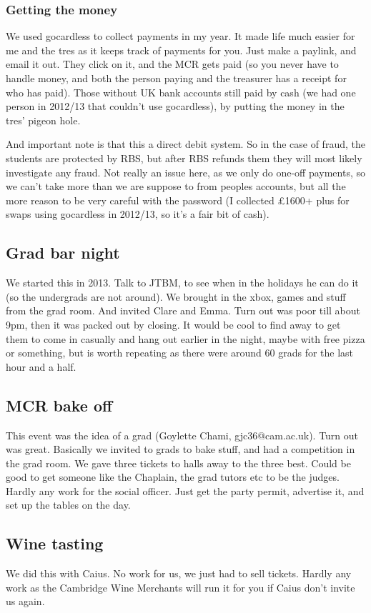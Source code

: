 \documentclass[9.5pt]{article} %
\begin{document}
\subsubsection{Getting the money}
We used gocardless to collect payments in my year. It made life much easier for me and the tres as it keeps track of payments for you. Just make a paylink, and email it out. They click on it, and the MCR gets paid (so you never have to handle money, and both the person paying and the treasurer has a receipt for who has paid). Those without UK bank accounts still paid by cash (we had one person in 2012/13 that couldn't use gocardless), by putting the money in the tres' pigeon hole.

And important note is that this a direct debit system. So in the case of fraud, the students are protected by RBS, but after RBS refunds them they will most likely investigate any fraud. Not really an issue here, as we only do one-off payments, so we can't take more than we are suppose to from peoples accounts, but all the more reason to be very careful with the password (I collected \pounds{1600}+ plus for swaps using gocardless in 2012/13, so it's a fair bit of cash).
\subsection{Grad bar night}
We started this in 2013. Talk to JTBM, to see when in the holidays he can do it (so the undergrads are not around). We brought in the xbox, games and stuff from the grad room. And invited Clare and Emma. Turn out was poor till about 9pm, then it was packed out by closing. It would be cool to find away to get them to come in casually and hang out earlier in the night, maybe with free pizza or something, but is worth repeating as there were around 60 grads for the last hour and a half.


\subsection{MCR bake off}
This event was the idea of a grad (Goylette Chami, gjc36@cam.ac.uk). Turn out was great. Basically we invited to grads to bake stuff, and had a competition in the grad room. We gave three tickets to halls away to the three best. Could be good to get someone like the Chaplain, the grad tutors etc to be the judges. Hardly any work for the social officer. Just get the party permit, advertise it, and set up the tables on the day.
\subsection{Wine tasting}
We did this with Caius. No work for us, we just had to sell tickets. Hardly any work as the Cambridge Wine Merchants will run it for you if Caius don't invite us again. 
\end{document}

